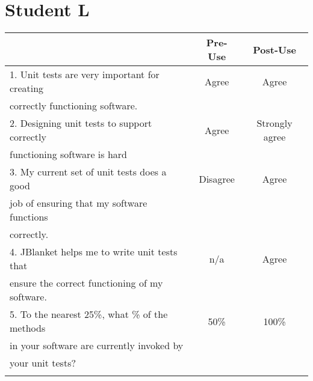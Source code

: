 \pagebreak

\section{Student L}

\begin{tabular}{lcc} \\
 & {\bf Pre-Use} & {\bf Post-Use} \\ \hline
1. Unit tests are very important for creating & Agree & Agree \\
   correctly functioning software. \\ \hline

2. Designing unit tests to support correctly & Agree & Strongly agree \\
   functioning software is hard\\ \hline

3. My current set of unit tests does a good & Disagree & Agree \\
   job of ensuring that my software functions \\
   correctly.\\ \hline

4. JBlanket helps me to write unit tests that & n/a & Agree \\
   ensure the correct functioning of my software.\\ \hline

5. To the nearest 25\%, what \% of the methods & 50\% & 100\% \\
   in your software are currently invoked by \\
   your unit tests?\\ \hline
\\
\end{tabular}

